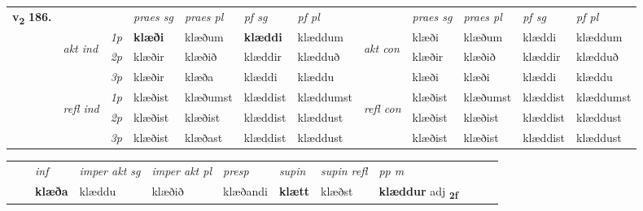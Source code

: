 \begin{tabular}{llllllllllll} \toprule
\multirow{4}{*}{{{\textbf{v{\textsubscript{2}}} \Large{\textbf{186.}}}}}  & &   &  \textit{praes sg}  & \textit{praes pl}  &\textit{ pf sg} & \textit{pf pl} &  &  \textit{praes sg}  & \textit{praes pl}  & \textit{pf sg} & \textit{pf pl } \\*
	\cmidrule{4-7} \cmidrule{9-12}
 & \multirow{3}{*}{\begin{turn}{90}\textit{akt ind}\end{turn}} & {\textit{1p}} & \textbf{klæði} & klæðum    & \textbf{klæddi} & klæddum & \multirow{3}{*}{\begin{turn}{90}\textit{akt con}\end{turn}} &klæði & klæðum & klæddi & klæddum\\*
& &  {\textit{2p}} &  klæðir  & klæðið   & klæddir & klædduð & & klæðir & klæðið & klæddir & klædduð \\*
& &  {\textit{3p}} & klæðir & klæða   & klæddi & klæddu & & klæði & klæði& klæddi & klæddu  \\*
\cmidrule{4-7} \cmidrule{9-12}
 &\multirow{3}{*}{\begin{turn}{90}\textit{refl ind}\end{turn}} & {\textit{1p}} & klæðist & klæðumst    & klæddist & klæddumst & \multirow{3}{*}{\begin{turn}{90}\textit{refl con}\end{turn}}  &klæðist & klæðumst & klæddist & klæddumst\\*
 &&  {\textit{2p}} &  klæðist  & klæðist   & klæddist & klæddust & &klæðist & klæðist & klæddist & klæddust \\*
& &  {\textit{3p}} & klæðist & klæðast   & klæddist & klæddust & & klæðist & klæðist& klæddist & klæddust  \\*
\cmidrule{4-7} \cmidrule{9-12}
\end{tabular}


\begin{tabular}{llllllllllll}
 & & \textit{inf} & \textit{imper akt sg} & \textit{imper akt pl}   & \textit{presp} & \textit{supin} & \textit{supin refl} & \textit{pp m}     \\*
  & & \textbf{klæða} & klæddu  & klæðið   & klæðandi &  \textbf{klætt} & klæðst & \textbf{klæddur} adj \textbf{\textsubscript{2f}} \\*
\cmidrule{1-12}
\end{tabular}



